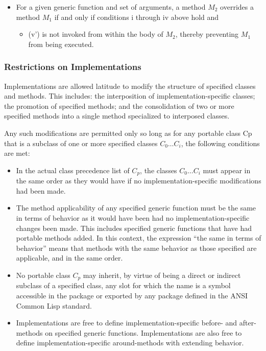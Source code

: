 \begin{itemize}
    \item 
    For a given generic function and set of arguments, a method $M_2$ overrides a
    method $M_1$ if and only if conditions i through iv above hold and 

    \begin{itemize}
    \item 
      (v')  is not invoked from within the body of $M_2$, thereby
      preventing $M_1$ from being executed. 
    \end{itemize}
  \end{itemize}


\subsubsection{Restrictions on Implementations}

Implementations are allowed latitude to modify the structure of specified
classes and methods. This includes: the interposition of implementation-specific
classes; the promotion of specified methods; and the consolidation of two or
more specified methods into a single method specialized to interposed classes. 

Any such modifications are permitted only so long as for any portable class Cp
that is a subclass of one or more specified classes $C_0 \ldots C_i$, the following
conditions are met: 


  \begin{itemize}
  \item 
    In the actual class precedence list of $C_p$, the classes $C_0 \ldots C_i$ must appear
    in the same order as they would have if no implementation-specific
    modifications had been made. 
  \item 
    The method applicability of any specified generic function must be the same
    in terms of behavior as it would have been had no implementation-specific
    changes been made. This includes specified generic functions that have had
    portable methods added. In this context, the expression ``the same in terms
    of behavior'' means that methods with the same behavior as those specified
    are applicable, and in the same order. 
  \item 
    No portable class $C_p$ may inherit, by virtue of being a direct or indirect
    subclass of a specified class, any slot for which the name is a symbol
    accessible in the  package or exported by any package
    defined in the ANSI Common Lisp standard. 
  \item 
    Implementations are free to define implementation-specific before- and
    after-methods on specified generic functions. Implementations are also free
    to define implementation-specific around-methods with extending behavior. 
  \end{itemize}


